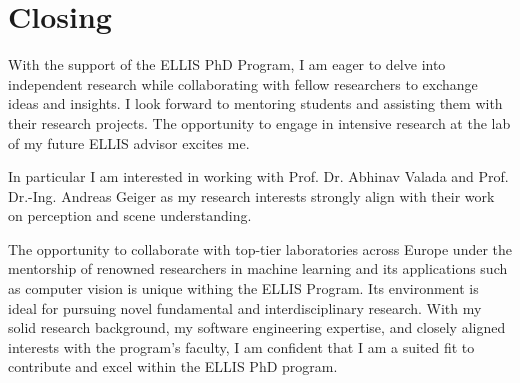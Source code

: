 \section{Closing}
With the support of the ELLIS PhD Program, I am eager to delve into independent research while collaborating with fellow researchers to exchange ideas and insights. I look forward to mentoring students and assisting them with their research projects. The opportunity to engage in intensive research at the lab of my future ELLIS advisor excites me. 

In particular I am interested in working with Prof. Dr. Abhinav Valada and Prof. Dr.-Ing. Andreas Geiger as my research interests strongly align with their work on perception and scene understanding.

The opportunity to collaborate with top-tier laboratories across Europe under the mentorship of renowned researchers in machine learning and its applications such as computer vision is unique withing the ELLIS Program. Its environment is ideal for pursuing novel fundamental and interdisciplinary research. With my solid research background, my software engineering expertise, and closely aligned interests with the program’s faculty, I am confident that I am a suited fit to contribute and excel within the ELLIS PhD program.